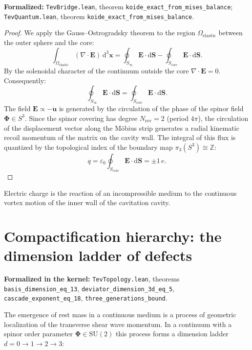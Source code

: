 \documentclass[11pt,a4paper]{article}
\theoremstyle{definition}
\theoremstyle{remark}
\begin{document}
\noindent\small\textbf{Formalized:} \texttt{TevBridge.lean}, theorem \texttt{koide_exact_from_mises_balance}; \texttt{TevQuantum.lean}, theorem \texttt{koide_exact_from_mises_balance}.


\begin{proof}
	We apply the Gauss--Ostrogradsky theorem to the region $\Omega_{\mathrm{elastic}}$ between the outer sphere and the core:
\begin{equation}
	\int_{\Omega_{\mathrm{elastic}}} (\nabla \cdot \mathbf{E}) \, \mathrm{d}^3\mathbf{x} = \oint_{S_\infty} \mathbf{E} \cdot \mathrm{d}\mathbf{S} - \oint_{S_{\mathrm{core}}} \mathbf{E} \cdot \mathrm{d}\mathbf{S}.
\end{equation}
By the solenoidal character of the continuum outside the core $\nabla \cdot \mathbf{E} = 0$. Consequently:
\begin{equation}
	\oint_{S_\infty} \mathbf{E} \cdot \mathrm{d}\mathbf{S} = \oint_{S_{\mathrm{core}}} \mathbf{E} \cdot \mathrm{d}\mathbf{S}.
\end{equation}
The field $\mathbf{E} \propto -\dot{\mathbf{u}}$ is generated by the circulation of the phase of the spinor field $\boldsymbol{\Phi} \in S^3$. Since the spinor covering has degree $N_{\mathrm{rev}} = 2$ (period $4\pi$), the circulation of the displacement vector along the M\"obius strip generates a radial kinematic recoil momentum of the matrix on the cavity wall. The integral of this flux is quantized by the topological index of the boundary map $\pi_3(S^3) \cong \mathbb{Z}$:
\begin{equation}
	q = \varepsilon_0 \oint_{S_{\mathrm{core}}} \mathbf{E} \cdot \mathrm{d}\mathbf{S} = \pm 1 \, e.
	\label{eq:charge_quantization_exact}
\end{equation}
\end{proof}
	
	Electric charge is the reaction of an incompressible medium to the continuous vortex motion of the inner wall of the cavitation cavity.
	
\section{Compactification hierarchy: the dimension ladder of defects}
\noindent\small\textbf{Formalized in the kernel:} \texttt{TevTopology.lean}, theorems \texttt{basis\_dimension\_eq\_13}, \texttt{deviator\_dimension\_3d\_eq\_5}, \texttt{cascade\_exponent\_eq\_18}, \texttt{three\_generations\_bound}.
	
	The emergence of rest mass in a continuous medium is a process of geometric localization of the transverse shear wave momentum. In a continuum with a spinor order parameter $\boldsymbol{\Phi} \in \mathrm{SU}(2)$ this process forms a dimension ladder $d = 0 \to 1 \to 2 \to 3$:
	
\end{document}
